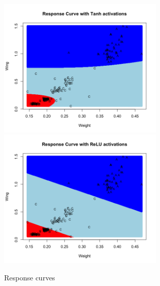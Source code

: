 \documentclass[12pt]{article}
\begin{document}
\begin{figure}[p]
\centering
\includegraphics[width=0.7\textwidth]{question_f_plot_A.png}
\includegraphics[width=0.7\textwidth]{question_f_plot_B.png}
\caption{Response curves}
\label{fig:fig3}
\end{figure}
\end{document}
